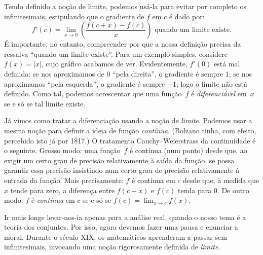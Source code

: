 \documentclass[../../../include/open-logic-section]{subfiles}
\begin{document}
Tendo definido a noção de limite, podemos usá-la para evitar por completo os
infinitesimais, estipulando que o gradiente de $f$ em $c$
é dado por:
\[
	{f}'(c) = \lim_{x \rightarrow 0}\left(\frac{f(c +x) - f(c)}{x}\right) \text{ quando um limite existe}.
\]
É importante, no entanto, compreender por que a nossa definição precisa da
ressalva ``quando um limite existe''. Para um exemplo simples, considere
$f(x) = |x|$, cujo gráfico acabamos de ver. Evidentemente, $f'(0)$ está
mal definida: se nos aproximamos de $0$ ``pela direita'', o gradiente é
sempre $1$; se nos aproximamos ``pela esquerda'', o gradiente é
sempre $-1$; logo o limite não está definido. Como tal, podemos acrescentar que uma
função~$f$ é \emph{diferenciável} em~$x$ se e só se tal limite existe.

Já vimos como tratar a diferenciação usando a noção de
\emph{limite}. Podemos usar a mesma noção para definir a ideia de função
\emph{contínua}. (Bolzano tinha, com efeito, percebido isto já por
1817.) O tratamento Cauchy--Weierstrass da continuidade é o seguinte.
Grosso modo: uma função~$f$ é contínua (num ponto) desde que, ao
exigir um certo grau de precisão relativamente à saída da
função, se possa garantir essa precisão insistindo num certo grau de
precisão relativamente à entrada da função. Mais precisamente: $f$ é
contínua em $c$ desde que, à medida que $x$ tende para zero, a diferença
entre $f(c + x)$ e $f(c)$ tenda para $0$. De outro modo: $f$
é \emph{contínua} em $c$ se e só se $f(c) = \lim_{x \rightarrow c} f(x)$. 

Ir mais longe levar-nos-ia apenas para a análise real, quando o nosso
tema é a teoria dos conjuntos. Por isso, agora devemos fazer uma pausa e enunciar a
moral. Durante o século XIX, os matemáticos aprenderam a passar
sem infinitesimais, invocando uma noção rigorosamente definida de
\emph{limite}.
\end{document}
